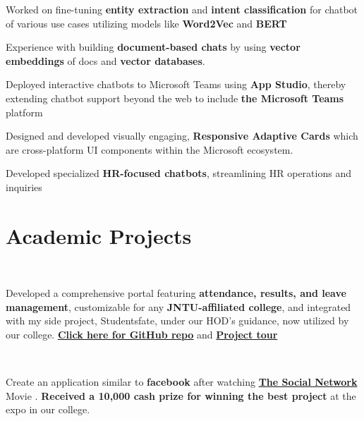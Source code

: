 \documentclass{deedy-resume-openfont}
\begin{document}
\begin{minipage}[t]{0.66\textwidth}
\descript{  }
\begin{tightemize}
\item  Worked on fine-tuning \textbf{entity extraction} and \textbf{intent classification} for chatbot of various use cases utilizing models like \textbf{Word2Vec} and \textbf{BERT}
\item Experience with building \textbf{document-based chats} by using \textbf{vector embeddings} of docs and \textbf{vector databases}.
\item Deployed interactive chatbots to Microsoft Teams using \textbf{App Studio}, thereby extending chatbot support beyond the web to include \textbf{the Microsoft Teams} platform
\item Designed and developed visually engaging, \textbf{Responsive Adaptive Cards} which are cross-platform UI components within the Microsoft ecosystem.
\end{tightemize}

\begin{tightemize}
\item Developed specialized \textbf{HR-focused chatbots}, streamlining HR operations and inquiries
\end{tightemize}
\sectionsep


\section{Academic Projects}
\\
\begin{tightemize}
\item Developed a comprehensive portal featuring \textbf{attendance, results, and leave management}, customizable for any \textbf{JNTU-affiliated college}, and integrated with my side project, Studentsfate, under our HOD's guidance, now utilized by our college. \textbf{\href{https://github.com/Prathap-Chandra/VIMS02/}{Click here for GitHub repo}} and \textbf{\href{https://www.youtube.com/watch?v=SD9KdLAw1OI}{Project tour}}
\end{tightemize}
\sectionsep

\\
\begin{tightemize}
\item Create an application similar to \textbf{facebook} after watching \textbf{\href{https://www.imdb.com/title/tt1285016/}{The Social Network}} Movie {}. \textbf{Received a {}10,000 cash prize for winning the best project} at the expo in our college. 
\end{tightemize}
\sectionsep
\nocite{*}

\end{minipage} 
\end{document}
